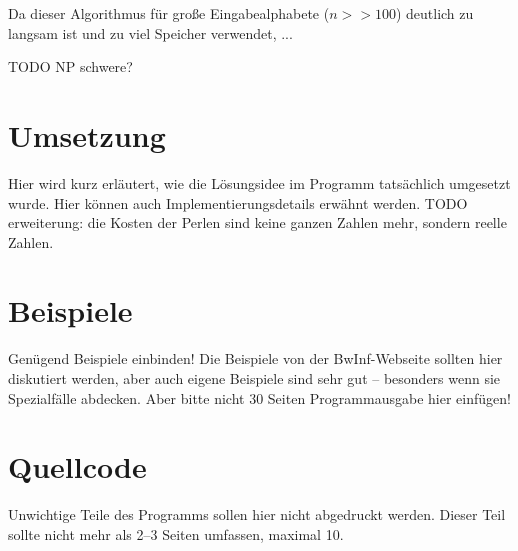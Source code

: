 \documentclass[a4paper,10pt,ngerman]{scrartcl}
\begin{document}
    Da dieser Algorithmus für große Eingabealphabete ($n >> 100$) deutlich zu langsam ist und zu viel Speicher verwendet, ...

%
%
%
%
%
%
%



    TODO NP schwere?


    \section{Umsetzung}
    Hier wird kurz erläutert, wie die Lösungsidee im Programm tatsächlich umgesetzt wurde. Hier können auch Implementierungsdetails erwähnt werden.
    TODO erweiterung: die Kosten der Perlen sind keine ganzen Zahlen mehr, sondern reelle Zahlen.


    \section{Beispiele}
    Genügend Beispiele einbinden! Die Beispiele von der BwInf-Webseite sollten hier diskutiert werden, aber auch eigene Beispiele sind sehr gut – besonders wenn sie Spezialfälle abdecken. Aber bitte nicht 30 Seiten Programmausgabe hier einfügen!


    \section{Quellcode}
    Unwichtige Teile des Programms sollen hier nicht abgedruckt werden. Dieser Teil sollte nicht mehr als 2–3 Seiten umfassen, maximal 10.
\end{document}
